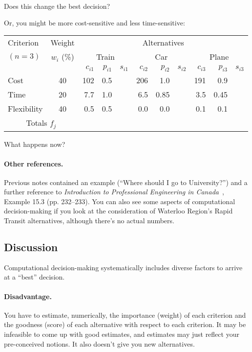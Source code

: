 {\sf Does this change the best decision?}
\vspace{2em}

Or, you might be more cost-sensitive and less time-sensitive:
{\Large
\begin{center}
\begin{tabular}{l|c|rrr|rrr|rrr}
Criterion & Weight & \multicolumn{9}{c}{Alternatives} \\
$(n=3)$ & $w_i$ (\%) & \multicolumn{3}{c|}{Train} & \multicolumn{3}{c|}{Car} & \multicolumn{3}{c}{Plane} \\
&& $c_{i1}$ & $p_{i1}$& $s_{i1}$ & $c_{i2}$ & $p_{i2}$ & $s_{i2}$ & $c_{i3}$ & $p_{i3}$ & $s_{i3}$ \\  \hline
Cost & 40 & 102 & 0.5 & & 206 & 1.0 & & 191 & 0.9 &  \\
Time & 20 & 7.7 & 1.0 & & 6.5 & 0.85 & & 3.5 & 0.45 \\
Flexibility & 40 & 0.5&0.5 &&0.0 &0.0 &&0.1 &0.1& \\ \hline
\multicolumn{2}{c|}{Totals $f_j$} & 
\end{tabular}
\end{center}
}

{\sf What happens now?}
\vspace{2em}

\paragraph{Other references.}
Previous notes contained an example (``Where should I go to
University?'') and a further reference to \emph{Introduction to
  Professional Engineering in Canada}~\cite{profengbook}, Example 15.3
(pp. 232--233). You can also see some aspects of computational
decision-making if you look at the consideration of Waterloo Region's
Rapid Transit alternatives, although there's no actual numbers.  

\subsection*{Discussion}
Computational decision-making systematically includes diverse factors
to arrive at a ``best'' decision.

\paragraph{Disadvantage.} You have to estimate, numerically, the 
importance (weight) of each criterion and the goodness (score) of each 
alternative with respect to each criterion. It may be infeasible to
come up with good estimates, and estimates may just reflect your
pre-conceived notions. It also doesn't give you new alternatives.

